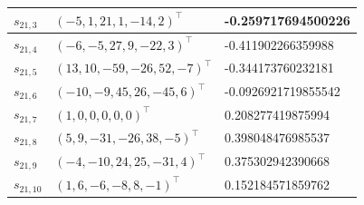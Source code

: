 \begin{table}[htbp]
\begin{tabular}{|l|l|l|}
\( s_{21,3} \) & \( (-5,1,21,1,-14,2)^\top \) & -0.259717694500226 \\ \hline
\( s_{21,4} \) & \( (-6,-5,27,9,-22,3)^\top \) & -0.411902266359988 \\ \hline
\( s_{21,5} \) & \( (13,10,-59,-26,52,-7)^\top \) & -0.344173760232181 \\ \hline
\( s_{21,6} \) & \( (-10,-9,45,26,-45,6)^\top \) & -0.0926921719855542 \\ \hline
\( s_{21,7} \) & \( (1,0,0,0,0,0)^\top \) & 0.208277419875994 \\ \hline
\( s_{21,8} \) & \( (5,9,-31,-26,38,-5)^\top \) & 0.398048476985537 \\ \hline
\( s_{21,9} \) & \( (-4,-10,24,25,-31,4)^\top \) & 0.375302942390668 \\ \hline
\( s_{21,10} \) & \( (1,6,-6,-8,8,-1)^\top \) & 0.152184571859762 \\
\hline
\end{tabular}
\end{table}



